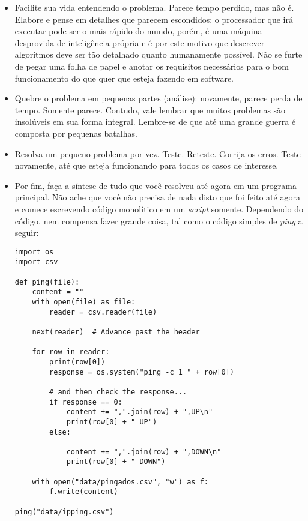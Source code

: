 \documentclass[a4paper, 12pt, onecolumn,singlespacing]{article}
\begin{document}
\begin{itemize}
	\item Facilite sua vida entendendo o problema. Parece tempo perdido, mas não é. Elabore e pense em detalhes que parecem escondidos: o processador que irá executar pode ser o mais rápido do mundo, porém, é uma máquina desprovida de inteligência própria e é por este motivo que descrever algoritmos deve ser tão detalhado quanto humanamente possível. Não se furte de pegar uma folha de papel e anotar os requisitos necessários para o bom funcionamento do que quer que esteja fazendo em software.
	
	\item Quebre o problema em pequenas partes (análise): novamente, parece perda de tempo. Somente parece. Contudo, vale lembrar que muitos problemas são insolúveis em sua forma integral. Lembre-se de que até uma grande guerra é composta por pequenas batalhas. 
	
	\item Resolva um pequeno problema por vez. Teste. Reteste. Corrija os erros. Teste novamente, até que esteja funcionando para todos os casos de interesse.
	
	\item Por fim, faça a síntese de tudo que você resolveu até agora em um programa principal. Não ache que você não precisa de nada disto que foi feito até agora e comece escrevendo código monolítico em um \textit{script} somente. Dependendo do código, nem compensa fazer grande coisa, tal como o código simples de \textit{ping} a seguir:
	
\begin{verbatim}
import os
import csv
	
def ping(file):
	content = ""
	with open(file) as file:
		reader = csv.reader(file)
	
	next(reader)  # Advance past the header
	
	for row in reader:
		print(row[0])
		response = os.system("ping -c 1 " + row[0])
	
		# and then check the response...
		if response == 0:
			content += ",".join(row) + ",UP\n"
			print(row[0] + " UP")
		else:
		
			content += ",".join(row) + ",DOWN\n"
			print(row[0] + " DOWN")
	
	with open("data/pingados.csv", "w") as f:
		f.write(content)

ping("data/ipping.csv")
\end{verbatim}


\end{itemize}
\end{document}
